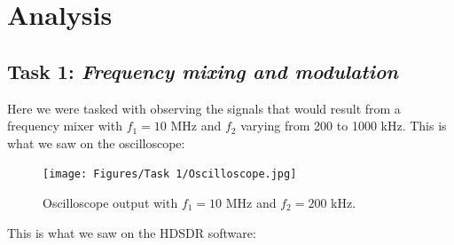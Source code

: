 \documentclass{article}
\begin{document}
\pagebreak{}

\section{Analysis}

\subsection{Task 1: \textit{Frequency mixing and modulation}}

Here we were tasked with observing the signals that would result from a frequency mixer with $f_1 = 10$ MHz and $f_2$ varying from 200 to 1000 kHz. This is what we saw on the oscilloscope:

\begin{figure}[h]
	\centering
	\texttt{[image: Figures/Task 1/Oscilloscope.jpg]}
	\caption{Oscilloscope output with $f_1 = 10$ MHz and $f_2 = 200$ kHz.}
	\label{fig:oscilloscope}
\end{figure}

This is what we saw on the HDSDR software:
\end{document}
